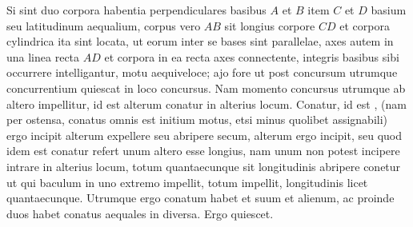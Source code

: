 \pstart%
Si sint duo corpora\protect{}  habentia perpendiculares basibus $A$ et $B$ item $C$ et $D$ basium seu latitudinum aequalium, corpus vero $AB$ sit longius  corpore $CD$ et corpora cylindrica\protect{} ita sint locata, ut eorum inter se bases sint parallelae, axes autem in una linea recta $AD$ et corpora in ea recta axes connectente, integris basibus sibi occurrere intelligantur, motu aequiveloce; ajo fore ut post concursum\protect{} utrumque concurrentium quiescat in loco concursus\protect{}. \pend \pstart Nam momento concursus\protect{} utrumque ab altero impellitur, id est alterum conatur in alterius locum. Conatur, id est , (nam per  ostensa, conatus\protect{} omnis est initium motus, etsi minus quolibet assignabili) ergo incipit alterum expellere seu abripere secum, alterum ergo incipit, seu quod idem est conatur  refert unum altero esse longius, nam unum non potest incipere intrare in alterius locum,  totum quantaecunque sit longitudinis abripere conetur ut qui baculum\protect{} in uno extremo impellit, totum impellit, longitudinis licet quantaecunque.
Utrumque ergo conatum\protect{} habet et suum et alienum, ac proinde duos habet conatus aequales in diversa.
Ergo quiescet.
\pend 
\count{}
\count{}
\count{}
